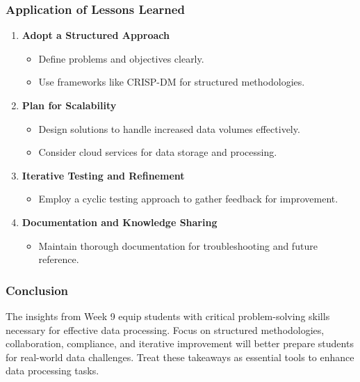 \documentclass[aspectratio=169]{beamer}
\begin{document}
\begin{frame}[fragile]
    \frametitle{Application of Lessons Learned}
    \begin{enumerate}
        \item \textbf{Adopt a Structured Approach}
        \begin{itemize}
            \item Define problems and objectives clearly.
            \item Use frameworks like CRISP-DM for structured methodologies.
        \end{itemize}
        
        \item \textbf{Plan for Scalability}
        \begin{itemize}
            \item Design solutions to handle increased data volumes effectively.
            \item Consider cloud services for data storage and processing.
        \end{itemize}

        \item \textbf{Iterative Testing and Refinement}
        \begin{itemize}
            \item Employ a cyclic testing approach to gather feedback for improvement.
        \end{itemize}

        \item \textbf{Documentation and Knowledge Sharing}
        \begin{itemize}
            \item Maintain thorough documentation for troubleshooting and future reference.
        \end{itemize}
    \end{enumerate}
\end{frame}

\begin{frame}[fragile]
    \frametitle{Conclusion}
    The insights from Week 9 equip students with critical problem-solving skills necessary for effective data processing. Focus on structured methodologies, collaboration, compliance, and iterative improvement will better prepare students for real-world data challenges. Treat these takeaways as essential tools to enhance data processing tasks.
\end{frame}
\end{document}
